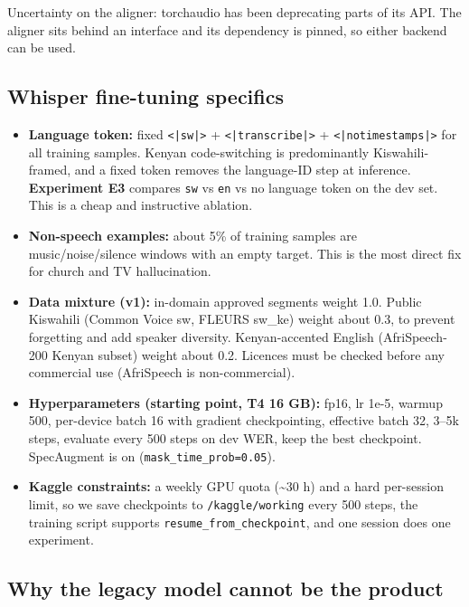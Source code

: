 \documentclass[11pt]{article}
\begin{document}
Uncertainty on the aligner: torchaudio has been deprecating parts of its API. The aligner sits behind an interface and its dependency is pinned, so either backend can be used.

\hypertarget{whisper-fine-tuning-specifics}{%
\subsection{Whisper fine-tuning specifics}\label{whisper-fine-tuning-specifics}}

\begin{itemize}
\tightlist
\item
  \textbf{Language token:} fixed \texttt{<|\allowbreak{}sw|\allowbreak{}>} + \texttt{<|\allowbreak{}transcribe|\allowbreak{}>} + \texttt{<|\allowbreak{}notimestamps|\allowbreak{}>} for all training samples. Kenyan code-switching is predominantly Kiswahili-framed, and a fixed token removes the language-ID step at inference. \textbf{Experiment E3} compares \texttt{sw} vs \texttt{en} vs no language token on the dev set. This is a cheap and instructive ablation.
\item
  \textbf{Non-speech examples:} about 5\% of training samples are music/noise/silence windows with an empty target. This is the most direct fix for church and TV hallucination.
\item
  \textbf{Data mixture (v1):} in-domain approved segments weight 1.0. Public Kiswahili (Common Voice sw, FLEURS sw\_ke) weight about 0.3, to prevent forgetting and add speaker diversity. Kenyan-accented English (AfriSpeech-200 Kenyan subset) weight about 0.2. Licences must be checked before any commercial use (AfriSpeech is non-commercial).
\item
  \textbf{Hyperparameters (starting point, T4 16 GB):} fp16, lr 1e-5, warmup 500, per-device batch 16 with gradient checkpointing, effective batch 32, 3--5k steps, evaluate every 500 steps on dev WER, keep the best checkpoint. SpecAugment is on (\texttt{mask\_\allowbreak{}time\_\allowbreak{}prob=\allowbreak{}0.\allowbreak{}05}).
\item
  \textbf{Kaggle constraints:} a weekly GPU quota (\textasciitilde30 h) and a hard per-session limit, so we save checkpoints to \texttt{/\allowbreak{}kaggle/\allowbreak{}working} every 500 steps, the training script supports \texttt{resume\_\allowbreak{}from\_\allowbreak{}checkpoint}, and one session does one experiment.
\end{itemize}

\hypertarget{why-the-legacy-model-cannot-be-the-product}{%
\subsection{Why the legacy model cannot be the product}\label{why-the-legacy-model-cannot-be-the-product}}
\end{document}
